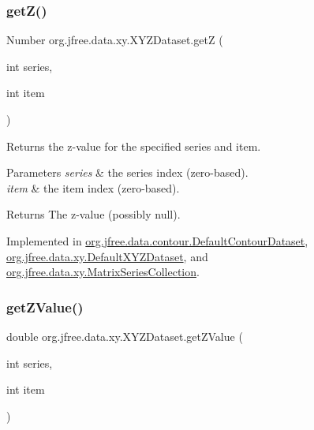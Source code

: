 \subsubsection{\texorpdfstring{get\+Z()}{getZ()}}
{\footnotesize\ttfamily Number org.\+jfree.\+data.\+xy.\+X\+Y\+Z\+Dataset.\+getZ (\begin{DoxyParamCaption}\item[{int}]{series,  }\item[{int}]{item }\end{DoxyParamCaption})}

Returns the z-\/value for the specified series and item.


\begin{DoxyParams}{Parameters}
{\em series} & the series index (zero-\/based). \\
\hline
{\em item} & the item index (zero-\/based).\\
\hline
\end{DoxyParams}
\begin{DoxyReturn}{Returns}
The z-\/value (possibly {\ttfamily null}). 
\end{DoxyReturn}


Implemented in \mbox{\hyperlink{classorg_1_1jfree_1_1data_1_1contour_1_1_default_contour_dataset_a47bf3f8c5cf2bb06f7243b2e159c3978}{org.\+jfree.\+data.\+contour.\+Default\+Contour\+Dataset}}, \mbox{\hyperlink{classorg_1_1jfree_1_1data_1_1xy_1_1_default_x_y_z_dataset_a9d64059ab691a5d4e2de1ba1e70bb02e}{org.\+jfree.\+data.\+xy.\+Default\+X\+Y\+Z\+Dataset}}, and \mbox{\hyperlink{classorg_1_1jfree_1_1data_1_1xy_1_1_matrix_series_collection_a8e762b03fe7fad0234cf73eed0947d18}{org.\+jfree.\+data.\+xy.\+Matrix\+Series\+Collection}}.

\mbox{\label{interfaceorg_1_1jfree_1_1data_1_1xy_1_1_x_y_z_dataset_a2aed0d6b0bbf979643691fc932efa2bc}} 
\subsubsection{\texorpdfstring{get\+Z\+Value()}{getZValue()}}
{\footnotesize\ttfamily double org.\+jfree.\+data.\+xy.\+X\+Y\+Z\+Dataset.\+get\+Z\+Value (\begin{DoxyParamCaption}\item[{int}]{series,  }\item[{int}]{item }\end{DoxyParamCaption})}

